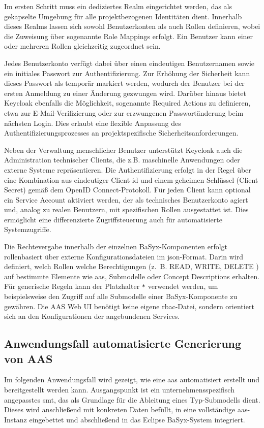 Im ersten Schritt muss ein dediziertes Realm eingerichtet werden, das als gekapselte Umgebung für alle projektbezogenen Identitäten dient.  
Innerhalb dieses Realms lassen sich sowohl Benutzerkonten als auch Rollen definieren, wobei die Zuweisung über sogenannte Role Mappings erfolgt.  
Ein Benutzer kann einer oder mehreren Rollen gleichzeitig zugeordnet sein.

Jedes Benutzerkonto verfügt dabei über einen eindeutigen Benutzernamen sowie ein initiales Passwort zur Authentifizierung.  
Zur Erhöhung der Sicherheit kann dieses Passwort als temporär markiert werden, wodurch der Benutzer bei der ersten Anmeldung zu einer Änderung gezwungen wird.  
Darüber hinaus bietet Keycloak ebenfalls die Möglichkeit, sogenannte Required Actions zu definieren, etwa zur E-Mail-Verifizierung oder zur erzwungenen Passwortänderung beim nächsten Login.  
Dies erlaubt eine flexible Anpassung des Authentifizierungsprozesses an projektspezifische Sicherheitsanforderungen.

Neben der Verwaltung menschlicher Benutzer unterstützt Keycloak auch die Administration technischer Clients, die z.B. maschinelle Anwendungen oder externe Systeme repräsentieren.  
Die Authentifizierung erfolgt in der Regel über eine Kombination aus eindeutiger Client-\acs{id} und einem geheimen Schlüssel (Client Secret) gemäß dem OpenID Connect-Protokoll.  
Für jeden Client kann optional ein Service Account aktiviert werden, der als technisches Benutzerkonto agiert und, analog zu realen Benutzern, mit spezifischen Rollen ausgestattet ist.  
Dies ermöglicht eine differenzierte Zugriffsteuerung auch für automatisierte Systemzugriffe.

Die Rechtevergabe innerhalb der einzelnen BaSyx-Komponenten erfolgt rollenbasiert über externe Konfigurationsdateien im \acs{json}-Format.  
Darin wird definiert, welch Rollen welche Berechtigungen (z.~B. READ, WRITE, DELETE ) auf bestimmte Elemente wie \acs{aas}, Submodelle oder Concept Descriptions erhalten.  
Für generische Regeln kann der Platzhalter \texttt{*} verwendet werden, um beispielsweise den Zugriff auf alle Submodelle einer BaSyx-Komponente zu gewähren.  
Die AAS Web UI benötigt keine eigene \acs{rbac}-Datei, sondern orientiert sich an den Konfigurationen der angebundenen Services.

\subsection{Anwendungsfall automatisierte Generierung von AAS}
Im folgenden Anwendungsfall wird gezeigt, wie eine \acs{aas} automatisiert erstellt und bereitgestellt werden kann.  
Ausgangspunkt ist ein unternehmensspezifisch angepasstes \acs{smt}, das als Grundlage für die Ableitung eines Typ-Submodells dient.  
Dieses wird anschließend mit konkreten Daten befüllt, in eine vollständige \acs{aas}-Instanz eingebettet und abschließend in das Eclipse BaSyx-System integriert.

